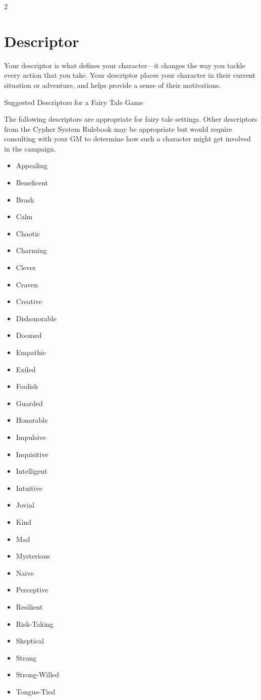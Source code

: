 \begin{multicols}{2}
\section{Descriptor}

Your descriptor is what defines your character—it changes the way you tackle every action that you take. Your descriptor places your character in their current situation or adventure, and helps provide a sense of their motivations.

Suggested Descriptors for a Fairy Tale Game

The following descriptors are appropriate for fairy tale settings. Other descriptors from the Cypher System Rulebook may be appropriate but would require consulting with your GM to determine how such a character might get involved in the campaign.
\begin{itemize}
\item Appealing 
\item Beneficent 
\item Brash
\item Calm
\item Chaotic
\item Charming
\item Clever
\item Craven
\item Creative
\item Dishonorable 
\item Doomed
\item Empathic
\item Exiled
\item Foolish
\item Guarded
\item Honorable 
\item Impulsive 
\item Inquisitive 
\item Intelligent 
\item Intuitive
\item Jovial
\item Kind
\item Mad
\item Mysterious
\item Naive
\item Perceptive
\item Resilient
\item Risk-Taking
\item Skeptical
\item Strong
\item Strong-Willed 
\item Tongue-Tied 

\end{itemize}
\end{multicols}
